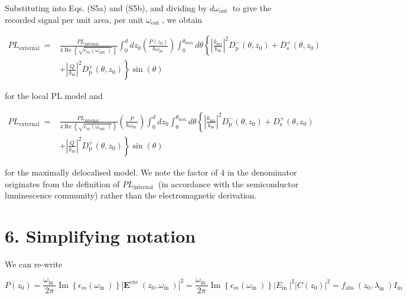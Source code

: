 \documentclass[10pt]{article}
\begin{document}
Substituting into Eqs. (S5a) and (S5b), and dividing by $d \omega_{\text {out }}$ to give the recorded signal per unit area, per unit $\omega_{\text {out }}$, we obtain

$$
\begin{aligned}
P L_{\text {external }}= & \frac{P L_{\text {internal }}}{4 \operatorname{Re}\left\{\sqrt{\epsilon_{m}\left(\omega_{\text {out }}\right)}\right\}} \int_{0}^{d} d z_{0}\left(\frac{P\left(z_{0}\right)}{\hbar \omega_{\text {in }}}\right) \int_{0}^{\theta_{\max }} d \theta\left\{\left|\frac{k_{\mathrm{m} z}}{k_{\mathrm{m}}}\right|^{2} D_{\mathrm{p}}^{-}\left(\theta, z_{0}\right)+D_{\mathrm{s}}^{+}\left(\theta, z_{0}\right)\right. \\
& \left.+\left|\frac{Q}{k_{\mathrm{m}}}\right|^{2} D_{\mathrm{p}}^{+}\left(\theta, z_{0}\right)\right\} \sin (\theta)
\end{aligned}
$$

for the local PL model and

$$
\begin{aligned}
P L_{\text {external }}= & \frac{P L_{\text {internal }}}{4 \operatorname{Re}\left\{\sqrt{\epsilon_{m}\left(\omega_{\text {out }}\right)}\right\}}\left(\frac{P}{\hbar \omega_{\text {in }}}\right) \int_{0}^{d} d z_{0} \int_{0}^{\theta_{\max }} d \theta\left\{\left|\frac{k_{\mathrm{m} z}}{k_{\mathrm{m}}}\right|^{2} D_{\mathrm{p}}^{-}\left(\theta, z_{0}\right)+D_{\mathrm{s}}^{+}\left(\theta, z_{0}\right)\right. \\
& \left.+\left|\frac{Q}{k_{\mathrm{m}}}\right|^{2} D_{\mathrm{p}}^{+}\left(\theta, z_{0}\right)\right\} \sin (\theta)
\end{aligned}
$$

for the maximally delocalised model. We note the factor of 4 in the denominator originates from the definition of $P L_{\text {internal }}$ (in accordance with the semiconductor luminescence community) rather than the electromagnetic derivation.

\section*{6. Simplifying notation}
We can re-write

$$
P\left(z_{0}\right)=\frac{\omega_{\text {in }}}{2 \pi} \operatorname{Im}\left\{\epsilon_{m}\left(\omega_{\text {in }}\right)\right\}\left|\mathbf{E}^{\text {exc }}\left(z_{0}, \omega_{\text {in }}\right)\right|^{2}=\frac{\omega_{\text {in }}}{2 \pi} \operatorname{Im}\left\{\epsilon_{m}\left(\omega_{\text {in }}\right)\right\}\left|E_{\text {in }}\right|^{2}\left|C\left(z_{0}\right)\right|^{2}=f_{\text {abs }}\left(z_{0}, \lambda_{\text {in }}\right) I_{\text {in }}
$$
\end{document}
